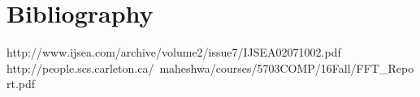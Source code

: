 \documentclass[review,1p]{elsarticle}
\begin{document}



\appendix
\section*{Bibliography}
http://www.ijsea.com/archive/volume2/issue7/IJSEA02071002.pdf\\
http://people.scs.carleton.ca/~maheshwa/courses/5703COMP/16Fall/FFT\_Report.pdf\\






\end{document}
